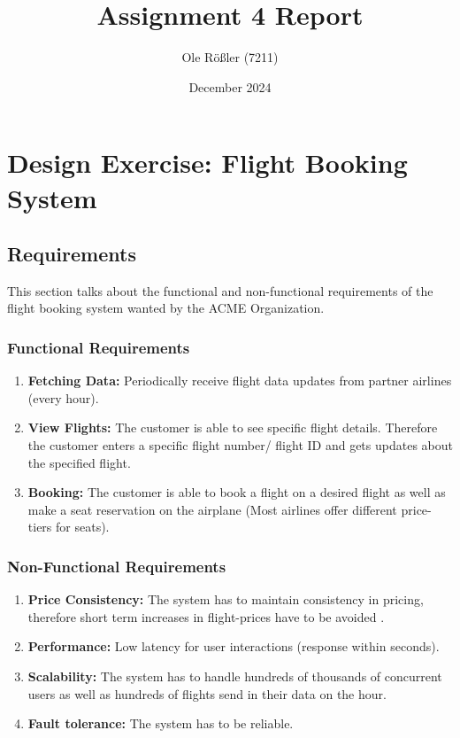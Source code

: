 \documentclass{article}
\title{Assignment 4 Report}
\author{Ole Rößler (7211)}
\date{December 2024}
\begin{document}
\maketitle
\tableofcontents

\newpage
\section{Design Exercise: Flight Booking System}

\subsection{Requirements}
This section talks about the functional and non-functional requirements of the flight booking system wanted by the ACME Organization. 
\subsubsection{Functional Requirements}
\begin{enumerate}

\item \textbf{Fetching Data:}
Periodically receive flight data updates from partner airlines (every hour).
\item \textbf{View Flights:}
The customer is able to see specific flight details. 
Therefore the customer enters a specific flight number/ flight ID and gets updates about the specified flight.
\item \textbf{Booking:}
The customer is able to book a flight on a desired flight as well as make a seat reservation on the airplane (Most airlines offer different price-tiers for seats). 
\end{enumerate}

\subsubsection{Non-Functional Requirements}
\begin{enumerate}
\item \textbf{Price Consistency:}
The system has to maintain consistency in pricing, therefore short term increases in flight-prices have to be avoided .
\item \textbf{Performance:}
Low latency for user interactions (response within seconds).
\item \textbf{Scalability:}
The system has to handle hundreds of thousands of concurrent users as well as hundreds of flights send in their data on the hour.
\item \textbf{Fault tolerance:}
The system has to be reliable.
\end{enumerate}
\end{document}
